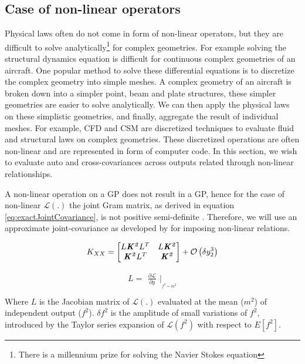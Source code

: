 \subsection{Case of non-linear operators}\label{subsecNonLinearOperators}
Physical laws often do not come in form of non-linear operators, but they are  difficult to solve analytically\footnote{There is a millennium prize for solving the Navier Stokes equation} for complex geometries. For example solving the structural dynamics equation is difficult for continuous complex geometries of an aircraft. One popular method to solve these differential equations is to discretize the complex geometry into simple meshes. A complex geometry of an aircraft is broken down into a simpler point, beam and plate structures, these simpler geometries are easier to solve analytically. We can then apply the physical laws on these simplistic geometries, and finally, aggregate the result of individual meshes. For example, CFD and CSM are discretized techniques to evaluate fluid and structural laws on complex geometries. These discretized operations are often non-linear and are represented in form of computer code. In this section, we wish to evaluate auto and cross-covariances across outputs related through non-linear relationships.

A non-linear operation on a GP does not result in a GP, hence for the case of non-linear \(\mathcal{L}\left ( . \right )\) the joint Gram matrix, as derived in equation \ref{eq:exactJointCovariance}, is not positive semi-definite \cite{Stein1999Springer}.  Therefore, we will use an approximate joint-covariance as developed by  \cite{Constantinescu2013} for imposing non-linear relations.

\begin{equation}\label{eq:approxJointCoariance}
K_{XX} = 
\begin{bmatrix}
L\bm{\mathit{K^2}}L^{T} & L\bm{\mathit{K^2}}\\ 
\bm{\mathit{K^2}}L^{T} & \bm{\mathit{K^2}}
\end{bmatrix} + \mathcal{O}\left ( \delta y_{2}^{3} \right )
\end{equation}

\begin{equation}
    L = \begin{matrix}
\frac{\partial \mathcal{L}}{\partial y} 
\end{matrix}|_{_{f^{2} = m^{2}}}
\end{equation}

Where $L$ is the Jacobian matrix of \(\mathcal{L}\left ( . \right )\) evaluated at the mean ($m^2$) of independent output (\(f^{2}\)). \(\delta f^{2}\) is the amplitude of small variations of \(f^{2}\), introduced by the Taylor series expansion of \(\mathcal{L}(f^2)\) with respect to \(E[f^{2}]\). 

